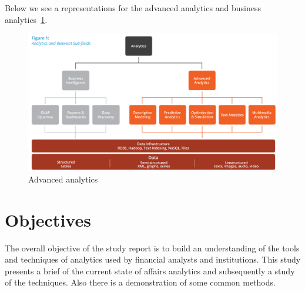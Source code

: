 Below we see a representations for the advanced analytics and business analytics~\ref{fig:rapidminer-aa}.

\begin{figure}[H]
	\includegraphics[scale=0.4]{figures/RapidMiner_AdvancedAnalytics.png}
	\caption{Advanced analytics}
	\label{fig:rapidminer-aa}
\end{figure}


\section{Objectives}

The overall objective of the study report is to build an understanding of the tools and techniques of analytics used by financial analysts and institutions. This study presents a brief of the current state of affairs analytics and subsequently a study of the techniques. Also there is a demonstration of some common methods.

